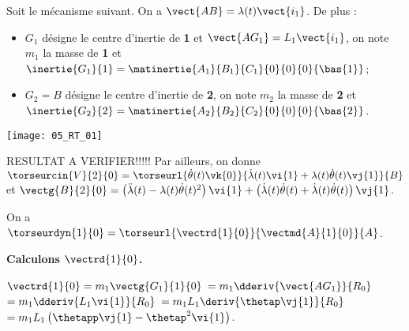 \normaltrue
\correctionfalse


\setcounter{question}{0}%
\ifcorrection
\else
{}
\fi

\ifprof
\else
Soit le mécanisme suivant. On a $\vect{AB}=\lambda(t)\vect{i_1}$. De plus :
\begin{itemize}
\item $G_1$ désigne le centre d'inertie de \textbf{1} et $\vect{AG_1}=L_1\vect{i_1}$, on note $m_1$ la masse de \textbf{1} et $\inertie{G_1}{1}=\matinertie{A_1}{B_1}{C_1}{0}{0}{0}{\bas{1}}$; 
\item $G_2=B$ désigne le centre d'inertie de \textbf{2}, on note $m_2$ la masse de \textbf{2} et $\inertie{G_2}{2}=\matinertie{A_2}{B_2}{C_2}{0}{0}{0}{\bas{2}}$.
\end{itemize}
\begin{marginfigure}
\texttt{[image: 05\_RT\_01]}
\end{marginfigure}

\ifcolle
\else
RESULTAT A VERIFIER!!!!!
Par ailleurs, on donne $\torseurcin{V}{2}{0} =\torseurl{\dot{\theta}(t)\vk{0}}{\dot{\lambda}(t)\vi{1}+\lambda(t)\dot{\theta}(t)\vj{1}}{B}$ et $\vectg{B}{2}{0} =  \left( \ddot{\lambda}(t)-\lambda(t)\dot{\theta}(t)^2\right)\vi{1}  +  \left( \dot{\lambda}(t)\dot{\theta}(t) +\dot{\lambda}(t)\dot{\theta}(t)\right) \vj{1}$.
\fi

\fi




\ifprof
On a $\torseurdyn{1}{0} = \torseurl{\vectrd{1}{0}}{\vectmd{A}{1}{0}}{A}$.

\textbf{Calculons $\vectrd{1}{0}$.}

$\vectrd{1}{0} = m_1 \vectg{G_1}{1}{0}$ $=m_1\dderiv{\vect{AG_1}}{R_0}$
$=m_1\dderiv{L_1\vi{1}}{R_0}$
$=m_1L_1\deriv{\thetap\vj{1}}{R_0}$
$=m_1L_1\left( \thetapp \vj{1} - \thetap^2 \vi{1} \right)$.

\else
\fi

\ifprof

\else
\fi

\ifcolle
{}

\else
\fi

\ifprof
\else


\fi